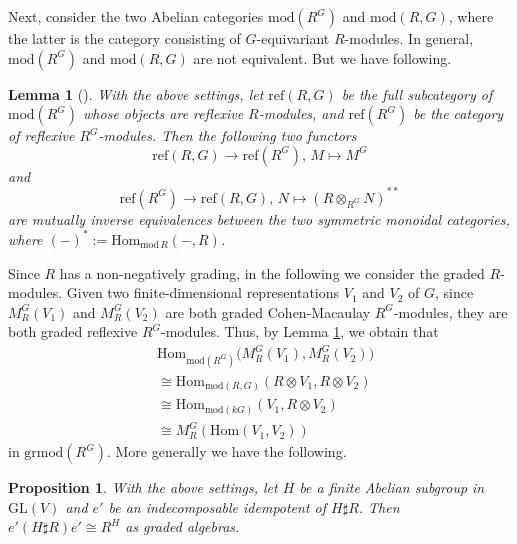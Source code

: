 \documentclass[11pt,reqno]{amsart}
\newtheorem{lemma}[theorem]{Lemma}
\newtheorem{proposition}[theorem]{Proposition}
\theoremstyle{definition}
\begin{document}
{\color{red}

Next, consider the two Abelian categories 
$\mathrm{mod}(R^{G})$ and 
$\mathrm{mod}(R, G)$, where the latter
is the category consisting of
$G$-equivariant $R$-modules. 
In general, $\mathrm{mod}(R^{G})$ and $\mathrm{mod}(R, G)$ are not equivalent.
But we have following.

\begin{lemma}[{\cite[Lemma 3.3]{SV}}]\label{Equi} 
With the above settings, let $\mathrm{ref}(R, G)$ be the full subcategory
of $\mathrm{mod}(R^{G})$
whose objects are reflexive $R$-modules, and $\mathrm{ref}(R^{G})$ be the category
of reflexive $R^{G}$-modules. Then the following two functors
\begin{equation*}
\mathrm{ref}(R, G) \to \mathrm{ref}(R^{G}),\,
M \mapsto M^{G}
\end{equation*}
and
\begin{equation*}
\mathrm{ref}(R^{G}) \to \mathrm{ref}(R, G),\,
N \mapsto (R \otimes_{R^{G}} N)^{\ast \ast}
\end{equation*}
are mutually inverse equivalences between the two symmetric monoidal categories,
where $(-)^{\ast}:=\mathrm{Hom}_{\mathrm{mod} \,R}(-, R)$.
\end{lemma}

Since $R$ has a non-negatively grading, in the following we consider
the graded $R$-modules.
Given two finite-dimensional representations $V_1$ and $V_2$ of $G$,
since $M^{G}_{R}(V_{1})$ and $M^{G}_{R}(V_{2})$ are both graded Cohen-Macaulay 
$R^{G}$-modules,
they are both graded reflexive $R^{G}$-modules. 
Thus, by Lemma \ref{Equi}, we obtain that
\begin{align*}
&\mathrm{Hom}_{\mathrm{mod}
(R^{G})}\big (M^{G}_{R}(V_{1}), M^{G}_{R}(V_{2}))\\
& \cong \mathrm{Hom}_{\mathrm{mod}(R, G)}
(R \otimes V_{1}, R \otimes V_{2}) \\
& \cong \mathrm{Hom}_{\mathrm{mod}(kG)}
( V_{1}, R \otimes V_{2} )\\
& \cong  M^{G}_{R}(\mathrm{Hom}(V_{1}, V_{2}))
\end{align*}
in $\mathrm{grmod}(R^{G})$.
More generally we have the following. 


\begin{proposition}\cite[Lemma 2.2]{BFC}\label{Abelianequi} 
With the above settings, 
let $H$ be a finite Abelian subgroup in $\mathrm{GL}(V)$ and $e'$ 
be an indecomposable idempotent of $H \sharp R$.
Then $
e' (H \sharp R) e' \cong R^{H}
$ as graded algebras. 
\end{proposition}

}
\end{document}
